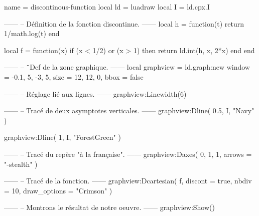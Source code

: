 \documentclass[border = 3pt]{standalone}
\begin{document}
\begin{luadraw*}{name = discontinous-function}
local ld = luadraw
local I  = ld.cpx.I

------
-- Définition de la fonction discontinue.
------
local h = function(t)
  return 1/math.log(t)
end

local f = function(x)
  if (x < 1/2) or (x > 1) then
    return ld.int(h, x, 2*x)
  end
end

------
-- ¨Def de la zone graphique.
------
local graphview = ld.graph:new{
  window = {-0.1, 5, -3, 5},
  size   = {12, 12, 0},
  bbox   = false
}

------
-- Réglage lié aux lignes.
------
graphview:Linewidth(6)

------
-- Tracé de deux asymptotes verticales.
------
graphview:Dline(
  {0.5, I},
  "Navy"
)

graphview:Dline(
  {1, I},
  "ForestGreen"
)

------
-- Tracé du repère "à la française".
------
graphview:Daxes(
  {0, 1, 1},
  {arrows = "-stealth"}
)

------
-- Tracé de la fonction.
------
graphview:Dcartesian(
  f,
  {
    discont      = true,
    nbdiv        = 10,
    draw_options = "Crimson"
  }
)

------
-- Montrons le résultat de notre oeuvre.
------
graphview:Show()
\end{luadraw*}
\end{document}
